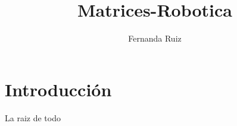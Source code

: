 \documentclass[12pt,a4paper,final]{article}
\author{Fernanda Ruiz}
\title{Matrices-Robotica}
\begin{document}
\tableofcontents
\section{Introducción}
La raiz de todo
\end{document}
